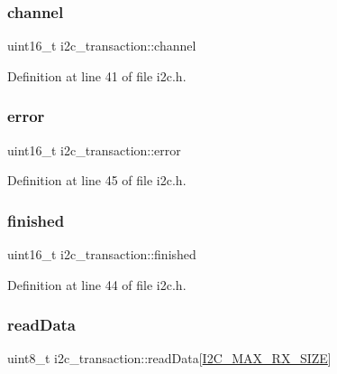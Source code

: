 \subsubsection{\texorpdfstring{channel}{channel}}
{\footnotesize\ttfamily uint16\+\_\+t i2c\+\_\+transaction\+::channel}



Definition at line 41 of file i2c.\+h.

\mbox{\label{structi2c__transaction_aaa551080eff5d54dc147058100f64091}} 
\subsubsection{\texorpdfstring{error}{error}}
{\footnotesize\ttfamily uint16\+\_\+t i2c\+\_\+transaction\+::error}



Definition at line 45 of file i2c.\+h.

\mbox{\label{structi2c__transaction_afd27122dedf3a0a08b1f1930219e0f8d}} 
\subsubsection{\texorpdfstring{finished}{finished}}
{\footnotesize\ttfamily uint16\+\_\+t i2c\+\_\+transaction\+::finished}



Definition at line 44 of file i2c.\+h.

\mbox{\label{structi2c__transaction_ab31c4effe7e39b1daa34bdbaf81d9c26}} 
\subsubsection{\texorpdfstring{readData}{readData}}
{\footnotesize\ttfamily uint8\+\_\+t i2c\+\_\+transaction\+::read\+Data\mbox{[}\mbox{\hyperlink{project__settings_8h_ad2b555d7882359c024c831c844d28f69}{I2\+C\+\_\+\+M\+A\+X\+\_\+\+R\+X\+\_\+\+S\+I\+ZE}}\mbox{]}}



